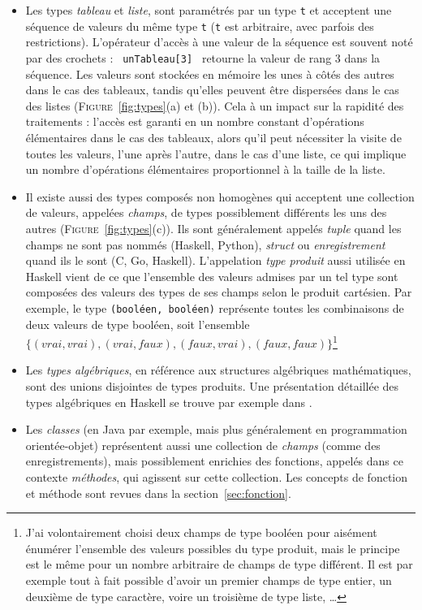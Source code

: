 \documentclass[a4paper,francais]{insalyon}
\begin{document}
\begin{itemize}
\item Les types \emph{tableau} et \emph{liste}, sont paramétrés par un type \texttt{t} et acceptent une séquence de valeurs du même type \texttt{t} (\texttt{t} est arbitraire, avec parfois des restrictions). L'opérateur d'accès à une valeur de la séquence est souvent noté par des crochets : \verb! unTableau[3] ! retourne la valeur de rang 3 dans la séquence. Les valeurs sont stockées en mémoire les unes à côtés des autres dans le cas des tableaux, tandis qu'elles peuvent être dispersées dans le cas des listes (\textsc{Figure}~\ref{fig:types}(a) et (b)). Cela à un impact sur la rapidité des traitements : l'accès est garanti en un nombre constant d'opérations élémentaires dans le cas des tableaux, alors qu'il peut nécessiter la visite de toutes les valeurs, l'une après l'autre, dans le cas d'une liste, ce qui implique un nombre d'opérations élémentaires proportionnel à la taille de la liste.
\item Il existe aussi des types composés non homogènes qui acceptent une collection de valeurs, appelées \emph{champs}, de types possiblement différents les uns des autres (\textsc{Figure}~\ref{fig:types}(c)). Ils sont généralement appelés \emph{tuple} quand les champs ne sont pas nommés (Haskell, Python), \emph{struct} ou \emph{enregistrement} quand ils le sont (C, Go, Haskell). L'appelation \emph{type produit} aussi utilisée en Haskell vient de ce que l'ensemble des valeurs admises par un tel type sont composées des valeurs des types de ses champs selon le produit cartésien. Par exemple, le type \verb!(booléen, booléen)! représente toutes les combinaisons de deux valeurs de type booléen, soit l'ensemble $\{ (vrai, vrai), (vrai, faux), (faux, vrai), (faux, faux) \}$\footnote{J'ai volontairement choisi deux champs de type booléen pour aisément énumérer l'ensemble des valeurs possibles du type produit, mais le principe est le même pour un nombre arbitraire de champs de type différent. Il est par exemple tout à fait possible d'avoir un premier champs de type entier, un deuxième de type caractère, voire un troisième de type liste, \ldots}   
\item Les \emph{types algébriques}, en référence aux structures algébriques mathématiques, sont des unions disjointes de types produits. Une présentation détaillée des types algébriques en Haskell se trouve par exemple dans \cite[chapitre 3]{haskell}.    
\item Les \emph{classes} (en Java par exemple, mais plus généralement en programmation orientée-objet) représentent aussi une collection de \emph{champs} (comme des enregistrements), mais possiblement enrichies des fonctions, appelés dans ce contexte \emph{méthodes}, qui agissent sur cette collection. Les concepts de fonction et méthode sont revues dans la section~\ref{sec:fonction}.
\end{itemize}
\end{document}
